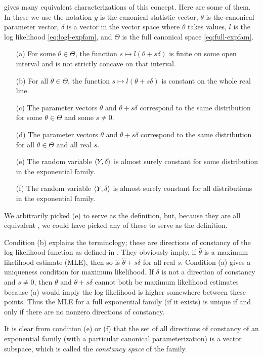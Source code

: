\citet[Theorem~1]{geyer-gdor} gives many equivalent
characterizations of this concept.  Here are some of them.
In these we use the notation $y$ is the canonical statistic vector,
$\theta$ is the canonical parameter vector, $\delta$ is a vector in
the vector space where $\theta$ takes values, $l$ is the log likelihood
\eqref{eq:logl-expfam}, and $\Theta$ is the full canonical space
\eqref{eq:full-expfam}.
\begin{enumerate}
\item[(a)] For some $\theta \in \Theta$,
    the function $s \mapsto l(\theta + s \delta)$ is finite on some open
    interval and is not strictly concave on that interval.
\item[(b)] For all $\theta \in \Theta$,
    the function $s \mapsto l(\theta + s \delta)$ is constant on the
    whole real line.
\item[(c)] The parameter vectors $\theta$ and $\theta + s \delta$ correspond
    to the same distribution for some $\theta \in \Theta$ and some $s \neq 0$.
\item[(d)] The parameter vectors $\theta$ and $\theta + s \delta$ correspond
    to the same distribution for all $\theta \in \Theta$ and all real $s$.
\item[(e)] The random variable $\langle Y, \delta \rangle$ is almost surely constant
    for some distribution in the exponential family.
\item[(f)] The random variable $\langle Y, \delta \rangle$ is almost surely constant
    for all distributions in the exponential family.
\end{enumerate}
We arbitrarily picked (e) to serve as the definition,
but, because they are all equivalent \citep[Theorem~1]{geyer-gdor},
we could have picked any of these to serve as the definition.

Condition (b) explains the terminology; these are directions of
constancy of the log likelihood function as defined in \citet{rockafellar}.
They obviously imply, if $\hat{\theta}$ is a maximum likelihood estimate (MLE),
then so is $\hat{\theta} + s \delta$ for all real $s$.
Condition (a) gives a uniqueness condition for maximum likelihood.
If $\delta$ is not a direction of constancy and $s \neq 0$,
then $\theta$ and $\theta + s \delta$ cannot both be maximum likelihood
estimates because (a) would imply the log likelihood is higher somewhere
between these points.  Thus the MLE for a full
exponential family (if it exists) is unique if and only if there are
no nonzero directions of constancy.

It is clear from condition (e) or (f) that the set of
all directions of constancy of an exponential family
(with a particular canonical parameterization) is a vector subspace,
which is called the \emph{constancy space} of the family.

